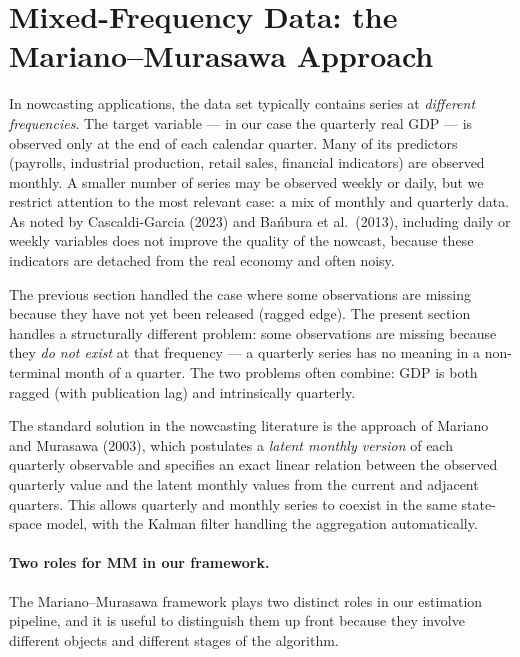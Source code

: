 \documentclass[11pt, a4paper, oneside]{article}
\begin{document}
\newpage

\section{Mixed-Frequency Data: the Mariano–Murasawa Approach}
\label{sec:mixed-frequency}

In nowcasting applications, the data set typically contains series at
\emph{different frequencies}. The target variable — in our case the
quarterly real GDP — is observed only at the end of each calendar
quarter. Many of its predictors (payrolls, industrial production,
retail sales, financial indicators) are observed monthly. A smaller
number of series may be observed weekly or daily, but we restrict
attention to the most relevant case: a mix of monthly and quarterly
data. As noted by Cascaldi-Garcia (2023) and Bańbura et al.\ (2013),
including daily or weekly variables does not improve the quality of
the nowcast, because these indicators are detached from the real
economy and often noisy.

The previous section handled the case where some observations are
missing because they have not yet been released (ragged edge). The
present section handles a structurally different problem: some
observations are missing because they \emph{do not exist} at that
frequency — a quarterly series has no meaning in a non-terminal month
of a quarter. The two problems often combine: GDP is both ragged
(with publication lag) and intrinsically quarterly.

The standard solution in the nowcasting literature is the approach of
Mariano and Murasawa (2003), which postulates a \emph{latent monthly
version} of each quarterly observable and specifies an exact linear
relation between the observed quarterly value and the latent monthly
values from the current and adjacent quarters. This allows quarterly
and monthly series to coexist in the same state-space model, with the
Kalman filter handling the aggregation automatically.

\paragraph{Two roles for MM in our framework.}
The Mariano–Murasawa framework plays two distinct roles in our
estimation pipeline, and it is useful to distinguish them up front
because they involve different objects and different stages of the
algorithm.
\end{document}
